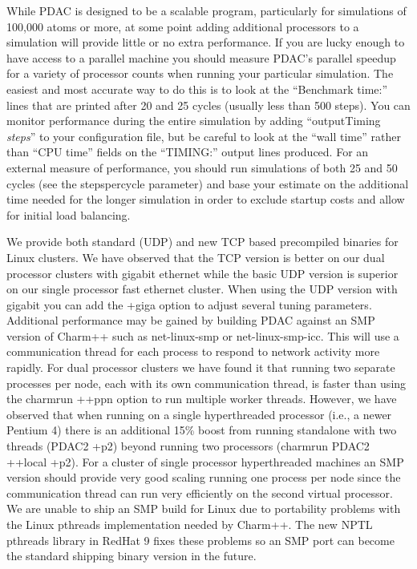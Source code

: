 While PDAC is designed to be a scalable program, particularly for
simulations of 100,000 atoms or more, at some point adding additional
processors to a simulation will provide little or no extra performance.
If you are lucky enough to have access to a parallel machine you should
measure PDAC's parallel speedup for a variety of processor counts when
running your particular simulation.  The easiest and most accurate way
to do this is to look at the ``Benchmark time:'' lines that are printed
after 20 and 25 cycles (usually less than 500 steps).  You can monitor
performance during the entire simulation by adding ``outputTiming {\em steps}''
to your configuration file, but be careful to look at the ``wall time''
rather than ``CPU time'' fields on the ``TIMING:'' output lines produced.
For an external measure of performance, you should run simulations of
both 25 and 50 cycles (see the stepspercycle parameter) and base your
estimate on the additional time needed for the longer simulation in
order to exclude startup costs and allow for initial load balancing.

We provide both standard (UDP) and new TCP based precompiled binaries
for Linux clusters.  We have observed that the TCP version is better
on our dual processor clusters with gigabit ethernet while the basic
UDP version is superior on our single processor fast ethernet cluster.
When using the UDP version with gigabit you can add the +giga option
to adjust several tuning parameters.  Additional performance may be
gained by building PDAC against an SMP version of Charm++ such as
net-linux-smp or net-linux-smp-icc.  This will use a communication
thread for each process to respond to network activity more rapidly.
For dual processor clusters we have found it that running two separate
processes per node, each with its own communication thread, is faster
than using the charmrun ++ppn option to run multiple worker threads.
However, we have observed that when running on a single hyperthreaded
processor (i.e., a newer Pentium 4) there is an additional 15\% boost
from running standalone with two threads (PDAC2 +p2) beyond running
two processors (charmrun PDAC2 ++local +p2).  For a cluster of single
processor hyperthreaded machines an SMP version should provide very
good scaling running one process per node since the communication
thread can run very efficiently on the second virtual processor.  We
are unable to ship an SMP build for Linux due to portability problems
with the Linux pthreads implementation needed by Charm++.  The new
NPTL pthreads library in RedHat 9 fixes these problems so an SMP port
can become the standard shipping binary version in the future.

